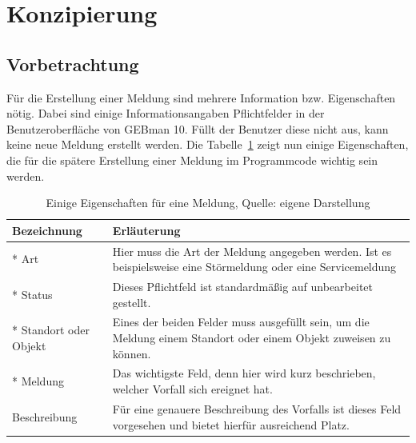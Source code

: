 \section{Konzipierung}

\subsection{Vorbetrachtung}
\noindent
Für die Erstellung einer Meldung sind mehrere Information bzw. Eigenschaften nötig. Dabei sind einige Informationsangaben Pflichtfelder in der Benutzeroberfläche von GEBman 10. Füllt der Benutzer diese nicht aus, kann keine neue Meldung erstellt werden. Die Tabelle~\ref{tab:Medlungseigenschaften} zeigt nun einige Eigenschaften, die für die spätere Erstellung einer Meldung im Programmcode wichtig sein werden.

\begin{table}[h!]
    \begin{tabular}{ | l | p{11cm}|}
    \hline
    Bezeichnung & Erläuterung \\ \hline
 * Art & Hier muss die Art der Meldung angegeben werden. Ist es beispielsweise eine Störmeldung oder eine Servicemeldung \\ \hline
 * Status & Dieses Pflichtfeld ist standardmäßig auf unbearbeitet gestellt.  \\ \hline
* Standort oder Objekt & Eines der beiden Felder muss ausgefüllt sein, um die Meldung einem Standort oder einem Objekt zuweisen zu können. \\ \hline
* Meldung & Das wichtigste Feld, denn hier wird kurz beschrieben, welcher Vorfall sich ereignet hat. \\ \hline
Beschreibung & Für eine genauere Beschreibung des Vorfalls ist dieses Feld vorgesehen und bietet hierfür ausreichend Platz. \\ \hline
    \end{tabular}
    \caption{Einige Eigenschaften für eine Meldung, Quelle: eigene Darstellung}
    \label{tab:Medlungseigenschaften}
\end{table}

